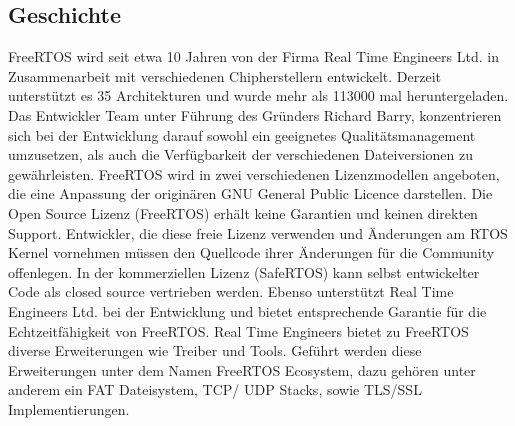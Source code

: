 \subsection{Geschichte}
FreeRTOS wird seit etwa 10 Jahren von der Firma Real Time Engineers Ltd. in Zusammenarbeit mit verschiedenen Chipherstellern entwickelt. Derzeit unterstützt es 35 Architekturen und wurde mehr als 113000 mal heruntergeladen. Das Entwickler Team unter Führung des Gründers Richard Barry, konzentrieren sich bei der Entwicklung darauf sowohl ein geeignetes Qualitätsmanagement umzusetzen, als auch die Verfügbarkeit der verschiedenen Dateiversionen zu gewährleisten. FreeRTOS wird in zwei verschiedenen Lizenzmodellen angeboten, die eine Anpassung der originären GNU General Public Licence darstellen. Die Open Source Lizenz (FreeRTOS) erhält keine Garantien und keinen direkten Support. Entwickler, die diese freie Lizenz verwenden und Än\-der\-ungen am RTOS Kernel vornehmen müssen den Quellcode ihrer Än\-der\-ungen für die Community offenlegen. In der kommerziellen Lizenz (SafeRTOS) kann selbst entwickelter Code als closed source vertrieben werden. Ebenso unterstützt Real Time Engineers Ltd. bei der Entwicklung und bietet entsprechende Garantie für die Echtzeitfähigkeit von FreeRTOS. Real Time Engineers bietet zu FreeRTOS diverse Erweiterungen wie Treiber und Tools. Geführt werden diese Erweiterungen unter dem Namen FreeRTOS Ecosystem, dazu gehören unter anderem ein FAT Dateisystem, TCP/ UDP Stacks, sowie TLS/SSL Implementierungen. 